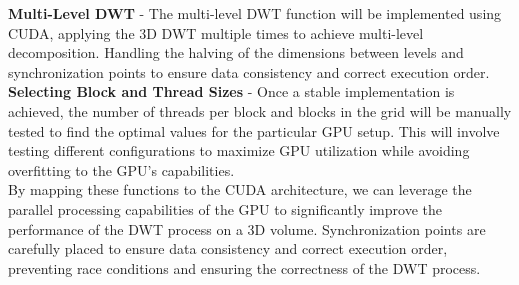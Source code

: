 \documentclass{article}
\begin{document}
\textbf{Multi-Level DWT} - The multi-level DWT function will be implemented using CUDA, applying the 3D DWT multiple times to achieve multi-level decomposition. Handling the halving of the dimensions between levels and synchronization points to ensure data consistency and correct execution order.\\

\textbf{Selecting Block and Thread Sizes} - Once a stable implementation is achieved, the number of threads per block and blocks in the grid will be manually tested to find the optimal values for the particular GPU setup. This will involve testing different configurations to maximize GPU utilization while avoiding overfitting to the GPU's capabilities.\\

By mapping these functions to the CUDA architecture, we can leverage the parallel processing capabilities of the GPU to significantly improve the performance of the DWT process on a 3D volume. Synchronization points are carefully placed to ensure data consistency and correct execution order, preventing race conditions and ensuring the correctness of the DWT process.
\end{document}
